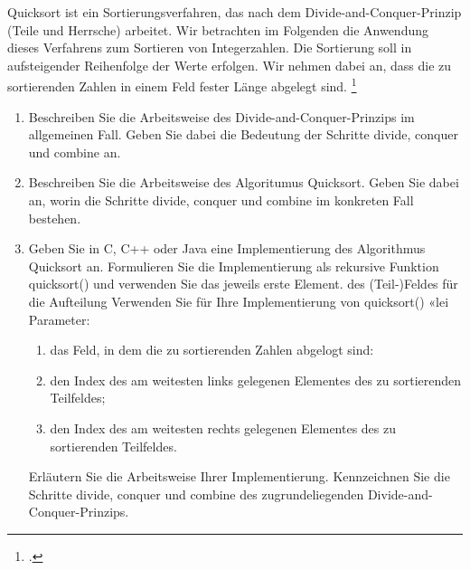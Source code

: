 \documentclass{bschlangaul-aufgabe}
\begin{document}

Quicksort ist ein Sortierungsverfahren, das nach dem
Divide-and-Conquer-Prinzip (Teile und Herrsche) arbeitet. Wir betrachten
im Folgenden die Anwendung dieses Verfahrens zum Sortieren von
Integerzahlen. Die Sortierung soll in aufsteigender Reihenfolge der
Werte erfolgen. Wir nehmen dabei an, dass die zu sortierenden Zahlen in
einem Feld fester Länge abgelegt sind.
\footcite{46114:2008:09}

\begin{enumerate}


\item Beschreiben Sie die Arbeitsweise des Divide-and-Conquer-Prinzips
im allgemeinen Fall. Geben Sie dabei die Bedeutung der Schritte divide,
conquer und combine an.


\item Beschreiben Sie die Arbeitsweise des Algoritumus Quicksort. Geben
Sie dabei an, worin die Schritte divide, conquer und combine im
konkreten Fall bestehen.


\item Geben Sie in C, C++ oder Java eine Implementierung des Algorithmus
Quicksort an. Formulieren Sie die Implementierung als rekursive Funktion
quicksort() und verwenden Sie das jeweils erste Element. des
(Teil-)Feldes für die Aufteilung Verwenden Sie für Ihre Implementierung
von quicksort() «lei Parameter:
\begin{enumerate}
\item

das Feld, in dem die zu sortierenden Zahlen abgelogt sind:

\item

den Index des am weitesten links gelegenen Elementes des zu sortierenden
Teilfeldes;

\item

den Index des am weitesten rechts gelegenen Elementes des zu
sortierenden Teilfeldes.
\end{enumerate}

Erläutern Sie die Arbeitsweise Ihrer Implementierung. Kennzeichnen Sie
die Schritte divide, conquer und combine des zugrundeliegenden
Divide-and-Conquer-Prinzips.
\end{enumerate}
\end{document}
